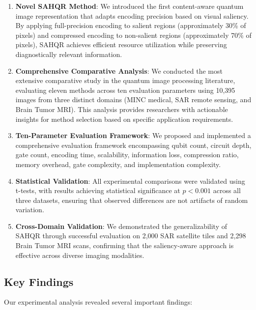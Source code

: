 \documentclass[pdflatex,sn-mathphys-num,Numbered]{sn-jnl}
\theoremstyle{thmstyleone}
\theoremstyle{thmstyletwo}
\theoremstyle{thmstylethree}
\begin{document}
\begin{enumerate}
\item \textbf{Novel SAHQR Method}: We introduced the first content-aware quantum image representation that adapts encoding precision based on visual saliency. By applying full-precision encoding to salient regions (approximately 30\% of pixels) and compressed encoding to non-salient regions (approximately 70\% of pixels), SAHQR achieves efficient resource utilization while preserving diagnostically relevant information.

\item \textbf{Comprehensive Comparative Analysis}: We conducted the most extensive comparative study in the quantum image processing literature, evaluating eleven methods across ten evaluation parameters using 10,395 images from three distinct domains (MINC medical, SAR remote sensing, and Brain Tumor MRI). This analysis provides researchers with actionable insights for method selection based on specific application requirements.

\item \textbf{Ten-Parameter Evaluation Framework}: We proposed and implemented a comprehensive evaluation framework encompassing qubit count, circuit depth, gate count, encoding time, scalability, information loss, compression ratio, memory overhead, gate complexity, and implementation complexity.

\item \textbf{Statistical Validation}: All experimental comparisons were validated using t-tests, with results achieving statistical significance at $p < 0.001$ across all three datasets, ensuring that observed differences are not artifacts of random variation.

\item \textbf{Cross-Domain Validation}: We demonstrated the generalizability of SAHQR through successful evaluation on 2,000 SAR satellite tiles and 2,298 Brain Tumor MRI scans, confirming that the saliency-aware approach is effective across diverse imaging modalities.
\end{enumerate}

\subsection{Key Findings}

Our experimental analysis revealed several important findings:
\end{document}
